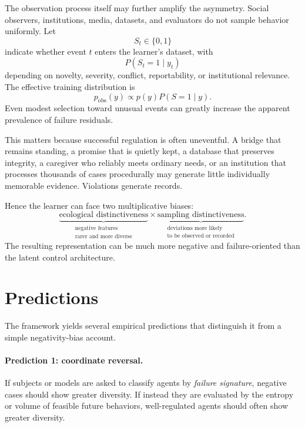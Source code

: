 \documentclass[11pt]{article}
\begin{document}
The observation process itself may further amplify the asymmetry. Social observers, institutions, media, datasets, and evaluators do not sample behavior uniformly. Let
\begin{equation}
    S_t\in\{0,1\}
\end{equation}
indicate whether event $t$ enters the learner's dataset, with
\begin{equation}
    P(S_t=1\mid y_t)
\end{equation}
depending on novelty, severity, conflict, reportability, or institutional relevance. The effective training distribution is
\begin{equation}
    p_{\mathrm{obs}}(y)
    \propto
    p(y)P(S=1\mid y).
\end{equation}
Even modest selection toward unusual events can greatly increase the apparent prevalence of failure residuals.

This matters because successful regulation is often uneventful. A bridge that remains standing, a promise that is quietly kept, a database that preserves integrity, a caregiver who reliably meets ordinary needs, or an institution that processes thousands of cases procedurally may generate little individually memorable evidence. Violations generate records.

Hence the learner can face two multiplicative biases:
\begin{equation}
\underbrace{\text{ecological distinctiveness}}_{\substack{\text{negative features}\\\text{rarer and more diverse}}}
\times
\underbrace{\text{sampling distinctiveness}}_{\substack{\text{deviations more likely}\\\text{to be observed or recorded}}}.
\end{equation}
The resulting representation can be much more negative and failure-oriented than the latent control architecture.

\section{Predictions}

The framework yields several empirical predictions that distinguish it from a simple negativity-bias account.

\paragraph{Prediction 1: coordinate reversal.}
If subjects or models are asked to classify agents by \emph{failure signature}, negative cases should show greater diversity. If instead they are evaluated by the entropy or volume of feasible future behaviors, well-regulated agents should often show greater diversity.
\end{document}
